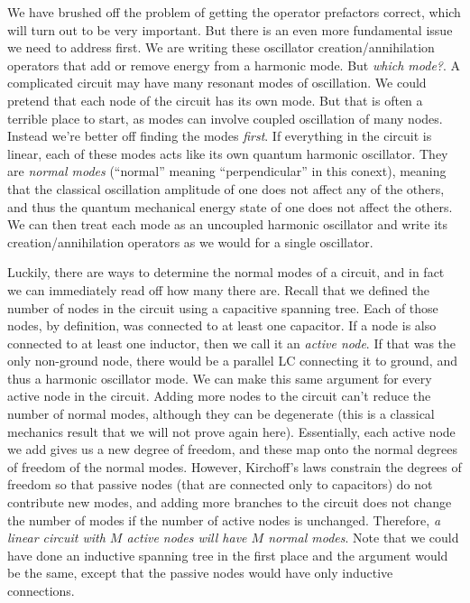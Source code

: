 We have brushed off the problem of getting the operator prefactors correct, which will turn out to be very important. But there is an even more fundamental issue we need to address first. We are writing these oscillator creation/annihilation operators that add or remove energy from a harmonic mode. But \textit{which mode?}. A complicated circuit may have many resonant modes of oscillation. We could pretend that each node of the circuit has its own mode. But that is often a terrible place to start, as modes can involve coupled oscillation of many nodes. Instead we're better off finding the modes \textit{first}. If everything in the circuit is linear, each of these modes acts like its own quantum harmonic oscillator. They are \textit{normal modes} (``normal'' meaning ``perpendicular'' in this conext), meaning that the classical oscillation amplitude of one does not affect any of the others, and thus the quantum mechanical energy state of one does not affect the others. We can then treat each mode as an uncoupled harmonic oscillator and write its creation/annihilation operators as we would for a single oscillator.

Luckily, there are ways to determine the normal modes of a circuit, and in fact we can immediately read off how many there are. Recall that we defined the number of nodes in the circuit using a capacitive spanning tree. Each of those nodes, by definition, was connected to at least one capacitor. If a node is also connected to at least one inductor, then we call it an \textit{active node}. If that was the only non-ground node, there would be a parallel LC connecting it to ground, and thus a harmonic oscillator mode. We can make this same argument for every active node in the circuit. Adding more nodes to the circuit can't reduce the number of normal modes, although they can be degenerate (this is a classical mechanics result that we will not prove again here). Essentially, each active node we add gives us a new degree of freedom, and these map onto the normal degrees of freedom of the normal modes. However, Kirchoff's laws constrain the degrees of freedom so that passive nodes (that are connected only to capacitors) do not contribute new modes, and adding more branches to the circuit does not change the number of modes if the number of active nodes is unchanged. Therefore, \textit{a linear circuit with $M$ active nodes will have $M$ normal modes}. Note that we could have done an inductive spanning tree in the first place and the argument would be the same, except that the passive nodes would have only inductive connections.


